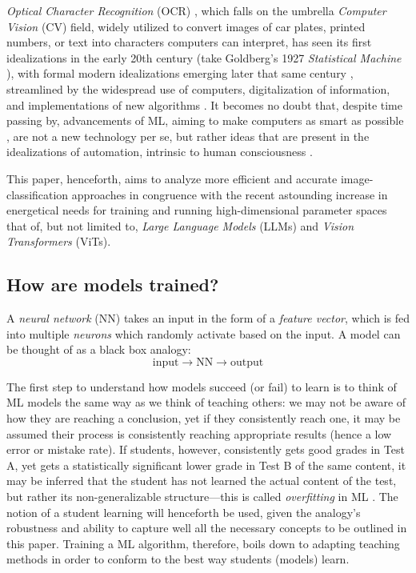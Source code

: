 \documentclass[conference]{IEEEtran}
\begin{document}
\textit{Optical Character Recognition} (OCR) \cite{dtic1978}, which falls on the umbrella \textit{Computer Vision} (CV) field, widely utilized to convert images of car plates, printed numbers, or text into characters computers can interpret, has seen its first idealizations in the early 20th century (take Goldberg's 1927 \textit{Statistical Machine} \cite{goldberg1927}), with formal modern idealizations emerging later that same century \cite{hough1962, hough1962_patent}, streamlined by the widespread use of computers, digitalization of information, and implementations of new algorithms \cite{cnn1989, tesseract2006}. It becomes no doubt that, despite time passing by, advancements of ML, aiming to make computers as smart as possible \cite{aima2021}, are not a new technology per se, but rather ideas that are present in the idealizations of automation, intrinsic to human consciousness \cite{kahneman2011}.

This paper, henceforth, aims to analyze more efficient and accurate image-classification approaches in congruence with the recent astounding increase in energetical needs for training and running high-dimensional parameter spaces that of, but not limited to, \textit{Large Language Models} (LLMs) and \textit{Vision Transformers} (ViTs).

\subsection{How are models trained?}

A \textit{neural network} (NN) takes an input in the form of a \textit{feature vector}, which is fed into multiple \textit{neurons} which randomly activate based on the input. A model can be thought of as a black box analogy:
\begin{equation}
    \text{input} \to \boxed{\text{NN} } \to \text{output}
\end{equation}

The first step to understand how models succeed (or fail) to learn is to think of ML models the same way as we think of teaching others: we may not be aware of how they are reaching a conclusion, yet if they consistently reach one, it may be assumed their process is consistently reaching appropriate results (hence a low error or mistake rate). If students, however, consistently gets good grades in Test A, yet gets a statistically significant lower grade in Test B of the same content, it may be inferred that the student has not learned the actual content of the test, but rather its non-generalizable structure---this is called \textit{overfitting} in ML \cite{overfitting2004}. The notion of a student learning will henceforth be used, given the analogy's robustness and ability to capture well all the necessary concepts to be outlined in this paper. Training a ML algorithm, therefore, boils down to adapting teaching methods in order to conform to the best way students (models) learn.
\end{document}

